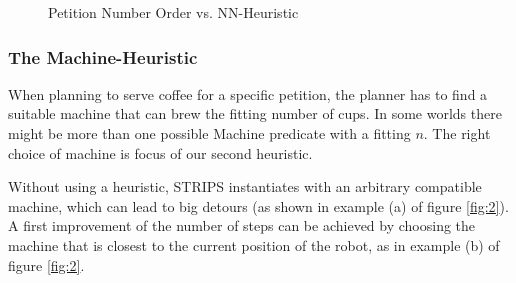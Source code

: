 \begin{figure}[!ht]
\centering     %
{}
\caption{Petition Number Order vs. NN-Heuristic}
\label{fig:1}
\end{figure}



\subsubsection{The Machine-Heuristic}

When planning to serve coffee for a specific petition, the planner has to find a suitable machine that can brew the fitting number of cups. In some worlds there might be more than one possible Machine predicate with a fitting $n$. The right choice of machine is focus of our second heuristic.

Without using a heuristic, STRIPS instantiates with an arbitrary compatible machine, which can lead to big detours (as shown in example (a) of figure \ref{fig:2}). A first improvement of the number of steps can be achieved by choosing the machine that is closest to the current position of the robot, as in example (b) of figure \ref{fig:2}. 

